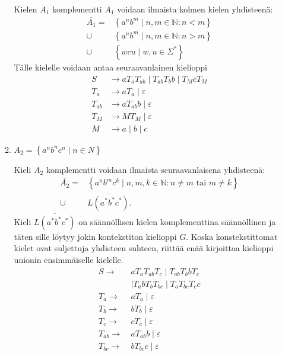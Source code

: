 \documentclass[a4paper,11pt]{article}
\newcommand{\set}[1]{{\left\{ #1 \right\}}}
\newcommand{\Nat}{\mathbb{N}}
\begin{document}
\begin{enumerate}
\begin{enumerate}
    Kielen $A_1$ komplementti $\overline{A_1}$ voidaan ilmaista kolmen
    kielen yhdisteenä:
    \begin{align*}
      \overline{A_1}
      = & \set{a^nb^m \mid n,m \in \Nat : n < m} \\
      \cup & \set{a^nb^m \mid n,m \in \Nat : n > m} \\
      \cup & \set{wcu \mid w,u \in \Sigma^*}
    \end{align*}
    Tälle kielelle voidaan antaa seuraavanlainen kielioppi
    \begin{align*}
      S & \to aT_aT_{ab} \mid T_{ab}T_bb \mid T_McT_M \\
      T_a & \to aT_a \mid \varepsilon \\
      T_{ab} & \to aT_{ab}b \mid \varepsilon \\
      T_M & \to MT_M \mid \varepsilon \\
      M & \to a \mid b \mid c
    \end{align*}
  \item
    $A_2 = \set{a^n b^n c^n \mid n \in N}$

    Kieli $A_2$ komplementti voidaan ilmaista seuraavanlaisena
    yhdisteenä:
    \begin{align*}
      \overline{A_2}
         = & \set{a^nb^mc^k \mid n,m,k \in \Nat : n \neq m \text{ tai }
                                                  m \neq k} \\
      \cup & \overline{L(a^*b^*c^*)} \text{.}
    \end{align*}
    Kieli $\overline{L(a^*b^*c^*)}$ on säännöllisen kielen komplementtina
    säännöllinen ja täten sille löytyy jokin kontekstiton kielioppi $G$. Koska
    konstekstittomat kielet ovat suljettuja yhdisteen suhteen, riittää enää
    kirjoittaa kielioppi unionin ensimmäiselle kielelle.
    \begin{align*}
      S \to\      & aT_aT_{ab}T_c \mid T_{ab}T_bbT_c \\
                  & \mid T_abT_{b}T_{bc} \mid T_aT_{bc}T_cc \\
      T_a \to\    & aT_a \mid \varepsilon \\
      T_b \to\    & bT_b \mid \varepsilon \\
      T_c \to\    & cT_c \mid \varepsilon \\
      T_{ab} \to\ & aT_{ab}b \mid \varepsilon \\
      T_{bc} \to\ & bT_{bc}c \mid \varepsilon
    \end{align*}
  \end{enumerate}
\end{enumerate}
\end{document}
